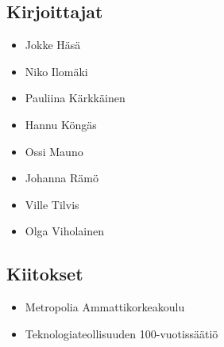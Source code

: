 \subsection*{Kirjoittajat}
\begin{itemize}
\item Jokke Häsä
\item Niko Ilomäki
\item Pauliina Kärkkäinen
\item Hannu Köngäs
\item Ossi Mauno
\item Johanna Rämö
\item Ville Tilvis
\item Olga Viholainen
\end{itemize}

\subsection*{Kiitokset}
\begin{itemize}
\item Metropolia Ammattikorkeakoulu %
\item Teknologiateollisuuden 100-vuotissäätiö %
\end{itemize}
